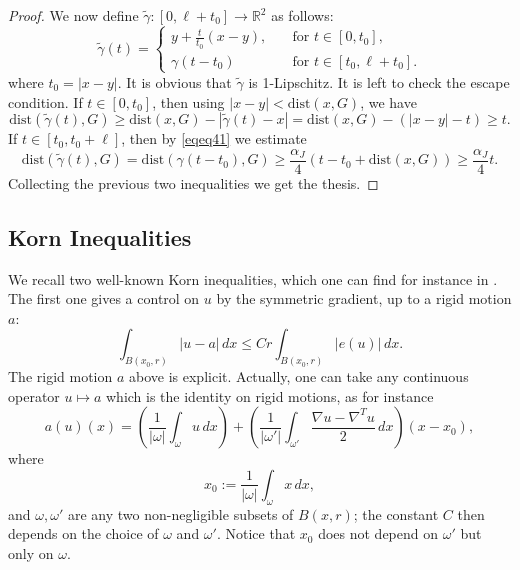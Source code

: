 \documentclass[12pt]{article}
\theoremstyle{definition}
\theoremstyle{remark}
\numberwithin{equation}{section}
\newcommand{\R}{\mathbb{R}}
\begin{document}
\begin{proof}
    We now define $\tilde{\gamma}\colon[0,\ell+t_0] \longrightarrow \R^2$ as follows:
    \begin{equation}
        \tilde{\gamma}(t)=
        \begin{cases}
            y+\frac{t}{t_0}(x-y),\quad&\text{for }t\in[0,t_0],\\
            \gamma(t-t_0) &\text{for }t\in[t_0,\ell+t_0].
        \end{cases}
    \end{equation}
    where $t_0=|x-y|$.
    It is obvious that $\tilde{\gamma}$ is 1-Lipschitz. It is left to check the escape condition. If $t\in[0,t_0]$, then using 
    $|x-y|<\mathrm{dist}(x,G)$, we have
    \begin{equation}
        \mathrm{dist}(\tilde{\gamma}(t),G)\geq \mathrm{dist}(x,G)-|\tilde\gamma(t)-x|=\mathrm{dist}(x,G)-(|x-y|-t)\geq t.
    \end{equation}
    If $t\in[t_0,t_0+\ell]$, then by \eqref{eqeq41} we estimate
    \begin{equation}
        \mathrm{dist}(\tilde{\gamma}(t),G)=\mathrm{dist}(\gamma(t-t_0),G)\geq \frac{\alpha_J}{4}(t-t_0+\mathrm{dist}(x,G))\geq \frac{\alpha_J}{4}t.
    \end{equation}
    Collecting the previous two inequalities we get the thesis.
\end{proof}



\subsection{Korn Inequalities}

We recall two well-known Korn inequalities, which one can find for instance in \cite{korn}. The first one gives a
control on $u$ by the symmetric gradient, up to a rigid motion $a$: 
\begin{equation}
    \int_{B(x_0,r)} |u-a| \,dx \leq C r \int_{B(x_0,r)} |e(u)| \,dx. \label{Korn1}
\end{equation}
The rigid motion $a$ above is explicit. Actually, one can take any continuous operator $u\mapsto a$ which is
the identity on rigid motions, as for instance
\begin{equation}\label{eq_explicit_Korn}
    a(u)(x)=\left(\frac{1}{|\omega|}\int_{\omega} u \,dx\right) + \left(\frac{1}{|\omega'|}\int_{\omega'} \frac{\nabla u - \nabla^T u}{2} \,dx\right)(x-x_0),
\end{equation}
where 
\[x_0:=\frac{1}{|\omega|}\int_{\omega} x \,dx,\]
and $\omega,\omega'$ are any two non-negligible subsets of $B(x,r)$; the constant $C$ then depends on the choice of
$\omega$ and $\omega'$.
Notice that $x_0$ does not depend on $\omega'$ but only on $\omega$.
\end{document}
